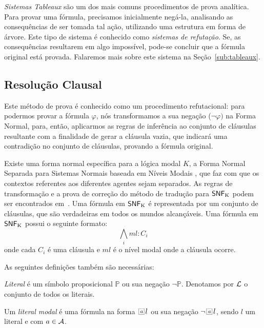 \textit{Sistemas Tableaux} são um dos mais comuns procedimentos de prova
analítica. Para provar uma fórmula, precisamos inicialmente negá-la, analisando
as consequências de ser tomada tal ação, utilizando uma estrutura em forma de
árvore. Este tipo de sistema é conhecido como \textit{sistemas de refutação}.
Se, as consequências resultarem em algo impossível, pode-se concluir que a
fórmula original está provada. Falaremos mais sobre este sistema na
Seção~\ref{sub:tableaux}.


\subsection{Resolução Clausal}
\label{clausal}

Este método de prova é conhecido como um procedimento refutacional: para
podermos provar a fórmula $\varphi$, nós transformamos a sua negação ($\neg
\varphi)$ na Forma Normal, para, então, aplicarmos as regras de inferência ao
conjunto de cláusulas resultante com a finalidade de gerar a cláusula vazia, que
indicará uma contradição no conjunto de cláusulas, provando a fórmula original. 

Existe uma forma normal específica para a lógica modal $K$, a Forma Normal
Separada para Sistemas Normais baseada em Níveis Modais , que faz com
que os contextos referentes aos diferentes agentes sejam separados. As regras de
transformação e a prova de correção do método de tradução para ${\sf SNF}\mbox{$_{\mbox{\scriptsize K}}$}$ podem
ser encontrados em~\cite{DBLP:conf/tableaux/NalonHD15}. Uma fórmula em ${\sf SNF}\mbox{$_{\mbox{\scriptsize K}}$}$
é representada por um conjunto de cláusulas, que são verdadeiras em todos os
mundos alcançáveis.  Uma fórmula em ${\sf SNF}\mbox{$_{\mbox{\scriptsize K}}$}$ possui o seguinte formato:
\begin{equation} \bigwedge_i ml: C_i \end{equation} onde cada $C_i$ é uma
    cláusula e $ml$ é o nível modal onde a cláusula ocorre.

As seguintes definições também são necessárias:

\begin{definition} \textit{Literal} é um símbolo proposicional $\mathbb{P}$ ou
sua negação $\neg \mathbb{P}$. Denotamos por $\cal{L}$ o conjunto de todos os
literais.  \end{definition}

\begin{definition} Um \textit{literal modal} é uma fórmula na forma
$\nec{\agent} l$ ou sua negação $\neg \nec{\agent} l$, sendo $l$ um literal e
com $a \in {\cal{A}}$.  \end{definition}


